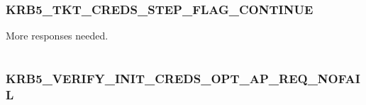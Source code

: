 \documentclass[letterpaper,10pt,english]{sphinxmanual}
\begin{document}
\subsubsection{KRB5\_TKT\_CREDS\_STEP\_FLAG\_CONTINUE}
\label{appdev/refs/macros/KRB5_TKT_CREDS_STEP_FLAG_CONTINUE:krb5-tkt-creds-step-flag-continue-data}\label{appdev/refs/macros/KRB5_TKT_CREDS_STEP_FLAG_CONTINUE::doc}\label{appdev/refs/macros/KRB5_TKT_CREDS_STEP_FLAG_CONTINUE:krb5-tkt-creds-step-flag-continue}

\begin{fulllineitems}
\label{appdev/refs/macros/KRB5_TKT_CREDS_STEP_FLAG_CONTINUE:KRB5_TKT_CREDS_STEP_FLAG_CONTINUE}
\end{fulllineitems}


More responses needed.

\begin{tabulary}{\linewidth}{|L|L|}
\hline

 & 
\\\hline
\end{tabulary}



\subsubsection{KRB5\_VERIFY\_INIT\_CREDS\_OPT\_AP\_REQ\_NOFAIL}
\label{appdev/refs/macros/KRB5_VERIFY_INIT_CREDS_OPT_AP_REQ_NOFAIL:krb5-verify-init-creds-opt-ap-req-nofail}\label{appdev/refs/macros/KRB5_VERIFY_INIT_CREDS_OPT_AP_REQ_NOFAIL::doc}\label{appdev/refs/macros/KRB5_VERIFY_INIT_CREDS_OPT_AP_REQ_NOFAIL:krb5-verify-init-creds-opt-ap-req-nofail-data}

\begin{fulllineitems}
\label{appdev/refs/macros/KRB5_VERIFY_INIT_CREDS_OPT_AP_REQ_NOFAIL:KRB5_VERIFY_INIT_CREDS_OPT_AP_REQ_NOFAIL}
\end{fulllineitems}


\begin{tabulary}{\linewidth}{|L|L|}
\hline

 & 
\\\hline
\end{tabulary}
\end{document}
